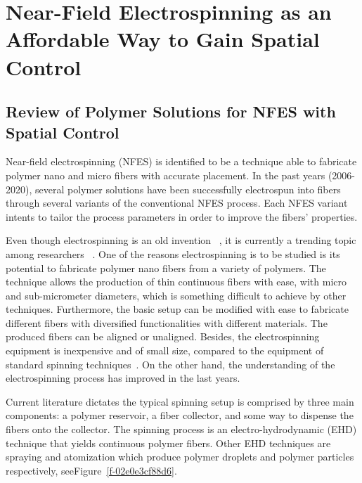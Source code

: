 \chapter{Near-Field Electrospinning as an Affordable Way to Gain Spatial Control} %

\label{Chapter:2}

\section{Review of Polymer Solutions for NFES with Spatial Control}

Near-field electrospinning (NFES) is identified to be a technique able to fabricate polymer nano and micro fibers with accurate placement. In the past years (2006-2020), several polymer solutions have been successfully electrospun into fibers through several variants of the conventional NFES process. Each NFES variant intents to tailor the process parameters in order to improve the fibers' properties. 

Even though electrospinning is an old invention \unskip~\cite{527120:12073288}, it is currently a trending topic among researchers \unskip~\cite{527120:12073453,527120:12073495,527120:12073496}. One of the reasons electrospinning is to be studied is its potential to fabricate polymer nano fibers from a variety of polymers. The technique allows the production of thin continuous fibers with ease, with micro and sub-micrometer diameters, which is something difficult to achieve by other techniques. Furthermore, the basic setup can be modified with ease to fabricate different fibers with diversified functionalities with different materials. The produced fibers can be aligned or unaligned. Besides, the electrospinning equipment is inexpensive and of small size, compared to the equipment of standard spinning techniques\unskip~\cite{527120:12073538}. On the other hand, the understanding of the electrospinning process has improved in the last years.

Current literature dictates the typical spinning setup is comprised by three main components: a polymer reservoir, a fiber collector, and some way to dispense the fibers onto the collector. The spinning process is an electro-hydrodynamic (EHD) technique that yields continuous polymer fibers. Other EHD techniques are spraying and atomization which produce polymer droplets and polymer particles respectively, seeFigure~\ref{f-02e0e3cf88d6}.

